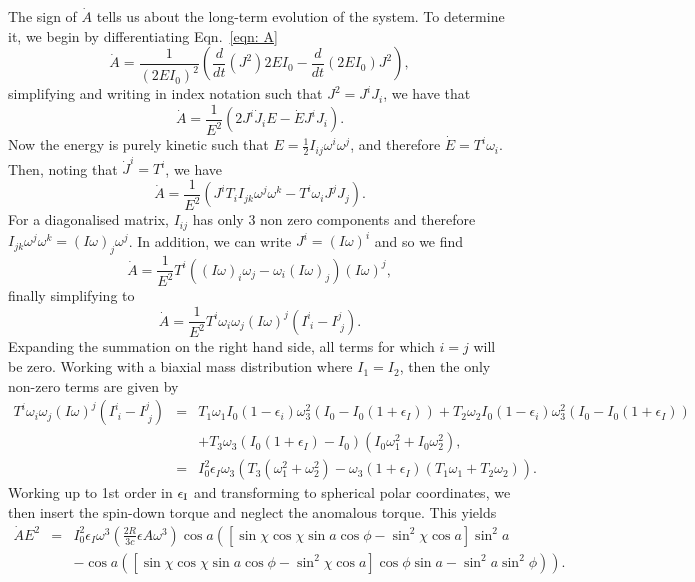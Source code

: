 \documentclass[../full_thesis/full_thesis.tex]{subfiles}
\begin{document}
The sign of $\dot{A}$ tells us about the long-term evolution of the system. To
determine it, we begin by differentiating Eqn.~\eqref{eqn: A}
\begin{equation}
\dot{A}=\frac{1}{(2EI_{0})^{2}}
        \left(\frac{d}{dt}(J^{2})2EI_{0}-\frac{d}{dt}(2EI_{0})J^{2}\right),
\end{equation}
simplifying and writing in index notation such that $J^{2}=J^iJ_i$, we have that
\begin{equation}
\dot{A}=\frac{1}{E^{2}}\left(2J^{i}\dot{J}_{i}E-\dot{E}J^{i}J_{i}\right).
\end{equation}
Now the energy is purely kinetic such that
$E=\frac{1}{2}I_{ij}\omega^{i}\omega^{j}$, and therefore $\dot{E}=T^{i}\omega_{i}$.
Then, noting that $\dot{J}^{i}=T^{i}$, we have
\begin{equation}
\dot{A}=\frac{1}{E^{2}}\left(J^{i}T_{i}I_{jk}\omega^{j}\omega^{k}
                             -T^{i}\omega_{i}J^{j}J_{j}\right).
\end{equation}
For a diagonalised matrix, $I_{ij}$ has only 3 non zero components and therefore
$I_{jk}\omega^{j}\omega^{k}=(I\omega)_{j}\omega^{j}$. In addition, we can write
$J^{i}=(I\omega)^{i}$ and so we find
\begin{equation}
\dot{A}=\frac{1}{E^{2}}T^{i}\left((I\omega)_{i}\omega_{j}
        -\omega_{i}(I\omega)_{j}\right)(I\omega)^{j},
\end{equation}
finally simplifying to
\begin{equation}
\dot{A}=\frac{1}{E^{2}}T^{i}\omega_{i}\omega_{j}
        (I\omega)^{j}\left(I^{i}_{\;i}-I^{j}_{\;j}\right).
\end{equation}
Expanding the
summation on the right hand side, all terms for which $i=j$ will be zero. Working with a biaxial mass
distribution where $I_{1}=I_{2}$, then the only non-zero terms are given by 
\begin{eqnarray*}
T^{i}\omega_{i}\omega_{j}(I\omega)^{j}\left(I^{i}_{\;i}-I^{j}_{\;j}\right)&=&
T_{1}\omega_{1}I_{0}(1-\epsilon_{i})\omega^{2}_{3}
(I_{0}-I_{0}(1+\epsilon_{I}))+
T_{2}\omega_{2}I_{0}(1-\epsilon_{i})\omega^{2}_{3}(I_{0}-I_{0}(1+\epsilon_{I})) 
\\ && + 
T_{3}\omega_{3}(I_{0}(1+\epsilon_{I})-I_{0})
               (I_{0}\omega_{1}^{2}+I_{0}\omega_{2}^{2}), \\
&=& I_{0}^{2}\epsilon_{I}\omega_{3}\left(T_{3}(\omega_{1}^{2}+\omega_{2}^{2}) 
    - \omega_{3}(1+\epsilon_{I})(T_{1}\omega_{1}+T_{2}\omega_{2})\right).
\end{eqnarray*}
Working up to 1st order in $\epsilon_{\mathrm{I}}$ and transforming to spherical polar
coordinates, we then insert the spin-down torque and neglect the anomalous torque.
This yields
\begin{eqnarray*}
\dot{A}E^{2}&=& I_{0}^{2}\epsilon_{I}\omega^{3}
    \left(\frac{2R}{3c}\epsilon{A}\omega^{3}\right)
    \cos a \left([\sin \chi \cos \chi \sin a \cos \phi 
                 - \sin^{2}\chi \cos a]\sin^{2} a \right. \\
&& \left.- \cos a ([\sin \chi \cos \chi \sin a \cos \phi 
                   - \sin^{2}\chi \cos a]\cos \phi \sin a 
                   - \sin^{2}a \sin^{2}\phi)\right).
\end{eqnarray*}
\end{document}
